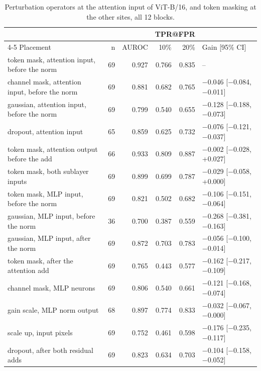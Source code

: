 \begin{table}[htbp]
\centering
\small
\caption{Perturbation operators at the attention input of ViT-B/16, and token masking at the other sites, all 12 blocks.}
\label{tab:staircase-operators}
\begin{tabular}{lrrrrl}
\toprule
 & & & \multicolumn{2}{c}{TPR@FPR} & \\
\cmidrule(lr){4-5}
Placement & n & AUROC & 10\% & 20\% & Gain [95\% CI] \\
\midrule
token mask, attention input, before the norm & 69 & 0.927 & 0.766 & 0.835 & -- \\
channel mask, attention input, before the norm & 69 & 0.881 & 0.682 & 0.765 & $-$0.046 [$-$0.084, $-$0.011] \\
gaussian, attention input, before the norm & 69 & 0.799 & 0.540 & 0.655 & $-$0.128 [$-$0.188, $-$0.073] \\
dropout, attention input & 65 & 0.859 & 0.625 & 0.732 & $-$0.076 [$-$0.121, $-$0.037] \\
token mask, attention output before the add & 66 & 0.933 & 0.809 & 0.887 & $-$0.002 [$-$0.028, +0.027] \\
token mask, both sublayer inputs & 69 & 0.899 & 0.699 & 0.787 & $-$0.029 [$-$0.058, +0.000] \\
token mask, MLP input, before the norm & 69 & 0.821 & 0.502 & 0.682 & $-$0.106 [$-$0.151, $-$0.064] \\
gaussian, MLP input, before the norm & 36 & 0.700 & 0.387 & 0.559 & $-$0.268 [$-$0.381, $-$0.163] \\
gaussian, MLP input, after the norm & 69 & 0.872 & 0.703 & 0.783 & $-$0.056 [$-$0.100, $-$0.014] \\
token mask, after the attention add & 69 & 0.765 & 0.443 & 0.577 & $-$0.162 [$-$0.217, $-$0.109] \\
channel mask, MLP neurons & 69 & 0.806 & 0.540 & 0.661 & $-$0.121 [$-$0.168, $-$0.074] \\
gain scale, MLP norm output & 68 & 0.897 & 0.774 & 0.833 & $-$0.032 [$-$0.067, $-$0.000] \\
scale up, input pixels & 69 & 0.752 & 0.461 & 0.598 & $-$0.176 [$-$0.235, $-$0.117] \\
dropout, after both residual adds & 69 & 0.823 & 0.634 & 0.703 & $-$0.104 [$-$0.158, $-$0.052] \\
\bottomrule
\end{tabular}
\end{table}
